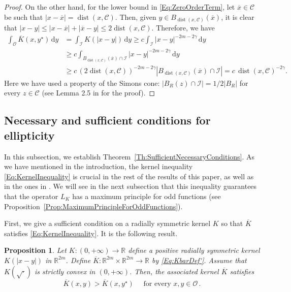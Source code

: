 \documentclass[12pt,reqno]{amsart}
\newtheorem{proposition}[theorem]{Proposition}
\theoremstyle{definition}
\theoremstyle{remark}
\newcommand{\con}[1]{\mathbb{#1}}
\newcommand{\R}{\con{R}} %
\newcommand{\ccal}{\mathscr{C}}
\newcommand{\ical}{\mathcal{I}}
\newcommand{\ocal}{\mathcal{O}}
\newcommand{\s}{\gamma}
\renewcommand{\d}{\,\mathrm{d}} %
\DeclareMathOperator{\dist}{dist}
\numberwithin{equation}{section}
\begin{document}
\begin{proof}
	On the other hand, for the lower bound in \eqref{Eq:ZeroOrderTerm}, let $\overline{x}\in \ccal$ be such that $|x-\overline{x}|=\dist(x,\ccal)$. Then, given $y\in B_{\dist(x,\ccal)}(\overline{x})$, it is clear that $|x-y|\leq |x-\overline{x}|+|\overline{x}-y|\leq 2\dist(x,\ccal)$. Therefore, we have
	\begin{align*}
	\int_{\ocal} \overline{K}(x, y^\star) \d y &=  \int_{\ical} K(|x-y|) \d y \geq c \int_{\ical} |x-y|^{-2m-2\s} \d y \\
	&\geq c \int_{B_{\dist(x,\ccal)}(\overline{x})\cap \ical} |x-y|^{-2m-2\s} \d y\\
	&\geq c \, (2\dist(x,\ccal))^{-2m-2\s} |B_{\dist(x,\ccal)}(\overline{x})\cap \ical| = c \,\dist(x,\ccal)^{-2\s}.
	\end{align*}
	Here we have used a property of the Simons cone: $|B_R(z)\cap \ical|=1/2|B_R|$ for every $z\in \ccal$ (see Lemma 2.5 in \cite{Felipe-Sanz-Perela:SaddleFractional} for the proof).
\end{proof}


\subsection{Necessary and sufficient conditions for ellipticity}




In this subsection, we establish Theorem~\ref{Th:SufficientNecessaryConditions}. As we have mentioned in the introduction, the kernel inequality \eqref{Eq:KernelInequality} is crucial in the rest of the results of this paper, as well as in the ones in \cite{FelipeSanz-Perela:IntegroDifferentialII}. We will see in the next subsection that this inequality guarantees that the operator $L_K$ has a maximum principle for odd functions (see Proposition~\ref{Prop:MaximumPrincipleForOddFunctions}).

First, we give a sufficient condition on a radially symmetric kernel $K$ so that $\overline{K}$ satisfies \eqref{Eq:KernelInequality}. It is the following result.

\begin{proposition}
	\label{Prop:KernelInequalitySufficientCondition} 
	Let $K:(0,+\infty) \to \R$ define a positive radially symmetric kernel $K(|x-y|)$ in $\R^{2m}$. Define $\overline{K} : \R^{2m}\times \R^{2m} \to \R$ by \eqref{Eq:KbarDef'}. Assume that $K(\sqrt{\cdot})$ is strictly convex in $(0,+\infty)$. Then, the associated kernel $\overline{K}$ satisfies
	\begin{equation}
	\label{Eq:KernelInequalityBis}
	\overline{K}(x,y) > \overline{K}(x, y^\star) \quad \text{ for every }x,y \in \ocal\,.
	\end{equation}
\end{proposition}
\end{document}
